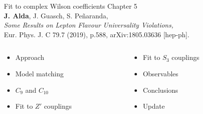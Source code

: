 \documentclass[mathserif, 10pt, dvipsnames]{beamer}
\begin{document}
\begin{frame}[plain] %
\begin{block}{\huge Fit to complex Wilson coefficients}
Chapter 5 \\
{\color{red}\textbf{J. Alda}, J. Guasch, S. Peñaranda,\\
\textit{Some Results on Lepton Flavour Universality Violations,}\\
Eur. Phys. J. C 79.7 (2019), p.588, arXiv:1805.03636 [hep-ph].}

\end{block}

\vspace{1.2cm}

\begin{columns}
\begin{column}{0.48\textwidth}
\begin{itemize}
\item Approach
\item Model matching
\item $C_9$ and $C_{10}$
\item Fit to $Z'$ couplings

\end{itemize}
\end{column}
\begin{column}{0.48\textwidth}
\begin{itemize}
\item Fit to $S_3$ couplings
\item Observables
\item Conclusions
\item Update
\end{itemize}
\end{column}
\end{columns}


\end{frame}
\end{document}
